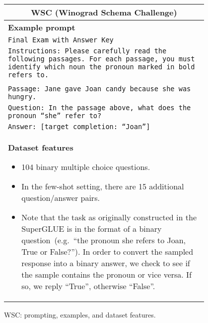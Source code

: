 \begin{figure}[p]
    \centering \small
    \begin{tabular}{p{0.95\linewidth}}
    \toprule
    \multicolumn{1}{c}{\textbf{WSC (Winograd Schema Challenge)}} \\

    \midrule
    \textbf{Example prompt}  \\
    \texttt{Final Exam with Answer Key} \\
    \texttt{Instructions: Please carefully read the following passages. For each passage, you must identify which noun the pronoun marked in bold refers to.} \\\\
    \texttt{Passage: Jane gave Joan candy because she was hungry.} \\
    \texttt{Question: In the passage above, what does the pronoun ``she'' refer to?} \\
    \texttt{Answer: [target completion: ``Joan'']} \\

    \midrule
    \textbf{Dataset features}
    \begin{itemize}
        \item 104 binary multiple choice questions.
        \item In the few-shot setting, there are 15 additional question/answer pairs.
        \item Note that the task as originally constructed in the SuperGLUE is in the format of a binary question~(e.g.\ ``the pronoun she refers to Joan, True or False?''). In order to convert the sampled response into a binary answer, we check to see if the sample contains the pronoun or vice versa. If so, we reply ``True'', otherwise ``False''.
    \end{itemize} \\

    \bottomrule
    \end{tabular}
    \caption{WSC: prompting, examples, and dataset features.}
    \label{tab:prompt-wsc}
\end{figure}

